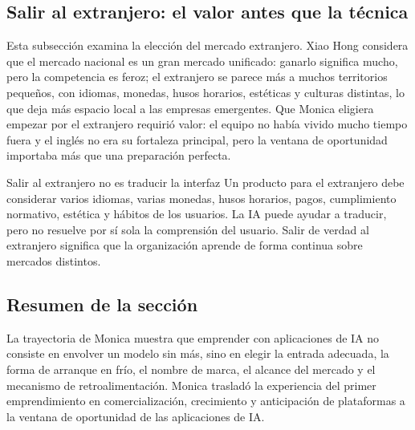 \subsection{Salir al extranjero: el valor antes que la técnica}

Esta subsección examina la elección del mercado extranjero. Xiao Hong considera que el mercado nacional es un gran mercado unificado: ganarlo significa mucho, pero la competencia es feroz; el extranjero se parece más a muchos territorios pequeños, con idiomas, monedas, husos horarios, estéticas y culturas distintas, lo que deja más espacio local a las empresas emergentes. Que Monica eligiera empezar por el extranjero requirió valor: el equipo no había vivido mucho tiempo fuera y el inglés no era su fortaleza principal, pero la ventana de oportunidad importaba más que una preparación perfecta.

\begin{warningbox}{Salir al extranjero no es traducir la interfaz}
Un producto para el extranjero debe considerar varios idiomas, varias monedas, husos horarios, pagos, cumplimiento normativo, estética y hábitos de los usuarios. La IA puede ayudar a traducir, pero no resuelve por sí sola la comprensión del usuario. Salir de verdad al extranjero significa que la organización aprende de forma continua sobre mercados distintos.
\end{warningbox}

\subsection{Resumen de la sección}

La trayectoria de Monica muestra que emprender con aplicaciones de IA no consiste en envolver un modelo sin más, sino en elegir la entrada adecuada, la forma de arranque en frío, el nombre de marca, el alcance del mercado y el mecanismo de retroalimentación. Monica trasladó la experiencia del primer emprendimiento en comercialización, crecimiento y anticipación de plataformas a la ventana de oportunidad de las aplicaciones de IA.
